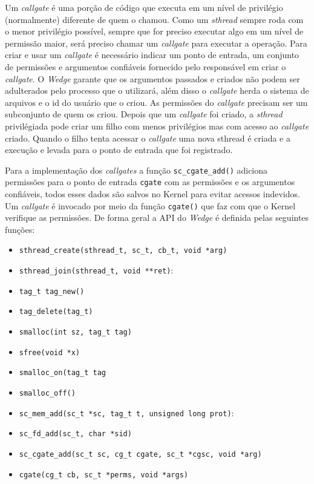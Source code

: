 Um \emph{callgate} é uma porção de código que executa em um nível de privilégio
(normalmente) diferente de quem o chamou. Como um \emph{sthread} sempre roda
com o menor privilégio possível, sempre que for preciso executar algo em um
nível de permissão maior, será preciso chamar um \emph{callgate} para executar
a operação. Para criar e usar um \emph{callgate} é necessário indicar um ponto
de entrada, um conjunto de permissões e argumentos confiáveis fornecido pelo
responsável em criar o \emph{callgate}. O \emph{Wedge} garante que os
argumentos passados e criados não podem ser adulterados pelo processo que o
utilizará, além disso o \emph{callgate} herda o sistema de arquivos e o id do
usuário que o criou. As permissões do \emph{callgate} precisam ser um
subconjunto de quem os criou. Depois que um \emph{callgate} foi criado, a
\emph{sthread} privilégiada pode criar um filho com menos privilégios mas com
acesso ao \emph{callgate} criado. Quando o filho tenta acessar o
\emph{callgate} uma nova sthread é criada e a execução e levada para o ponto de
entrada que foi registrado.

Para a implementação dos \emph{callgates} a função \texttt{sc\_cgate\_add()}
adiciona permissões para o ponto de entrada \texttt{cgate} com as permissões e
os argumentos confiáveis, todos esses dados são salvos no Kernel para evitar
acessos indevidos. Um \emph{callgate} é invocado por meio da função
\texttt{cgate()} que faz com que o Kernel verifique as permissões. De forma
geral a API do \emph{Wedge} é definida pelas seguintes funções:

\begin{itemize}
  \item \texttt{sthread\_create(sthread\_t, sc\_t, cb\_t, void *arg)}
  \item \texttt{sthread\_join(sthread\_t, void **ret)}:
  \item \texttt{tag\_t tag\_new()}
  \item \texttt{tag\_delete(tag\_t)}
  \item \texttt{smalloc(int sz, tag\_t tag)}
  \item \texttt{sfree(void *x)}
  \item \texttt{smalloc\_on(tag\_t tag}
  \item \texttt{smalloc\_off()}
  \item \texttt{sc\_mem\_add(sc\_t *sc, tag\_t t, unsigned long prot)}:
  \item \texttt{sc\_fd\_add(sc\_t, char *sid)}
  \item \texttt{sc\_cgate\_add(sc\_t sc, cg\_t cgate, sc\_t *cgsc, void *arg)}
  \item \texttt{cgate(cg\_t cb, sc\_t *perms, void *args)}
\end{itemize}


